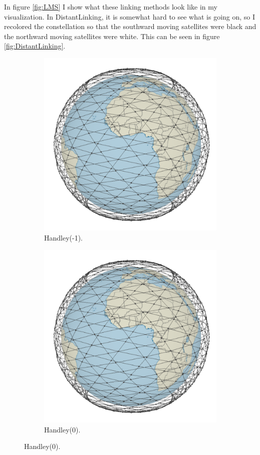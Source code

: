 \documentclass[12pt]{report}
\begin{document}
In figure \ref{fig:LMS} I show what these linking methods look like in my visualization. In DistantLinking, it is somewhat hard to see what is going on, so I recolored the constellation so that the southward moving satellites were black and the northward moving satellites were white. This can be seen in figure \ref{fig:DistantLinking}.

\begin{figure}
	\centering
	\caption{Images of the three linking methods that I examined}
	\label{fig:LMS}
	\begin{subfigure}[b]{0.3\textwidth}
		\caption{Handley(-1).}
		\includegraphics[width=\textwidth]{Handley-1}
	\end{subfigure}
	\hfill
	\begin{subfigure}[b]{0.3\textwidth}
		\caption{Handley(0).}
		\includegraphics[width=\textwidth]{Handley-1}

\end{subfigure}
\end{figure}
\end{document}
